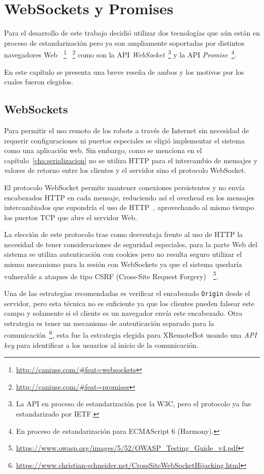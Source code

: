 \chapter{WebSockets y Promises}\label{cha:websockets_y_promises}

Para el desarrollo de este trabajo decidió utilizar dos tecnologías
que aún están en proceso de estandarización pero ya son ampliamente
soportadas por distintos navegadores
Web%
~\footnote{\url{http://caniuse.com/\#feat=websockets}}%
~\footnote{\url{http://caniuse.com/\#feat=promises}}
como son la API
\textit{WebSocket}~\footnote{La API en proceso de estandarización por la W3C,
pero el protocolo ya fue estandarizado por IETF.}
y la API \textit{Promise}~\footnote{En proceso de estandarización para
ECMAScript 6 (Harmony).}.

En este capítulo se presenta una breve reseña de ambos y los motivos
por los cuales fueron elegidos.

\section{WebSockets}

Para permitir el uso remoto de los robots a través de Internet sin necesidad
de requerir configuraciones ni puertos especiales se eligió implementar el
sistema como una
aplicación web. Sin embargo, como se menciona en el
capítulo~\ref{cha:serializacion} no se utiliza HTTP para el intercambio de
mensajes y valores de retorno entre los clientes y el servidor sino el
protocolo WebSocket.

El protocolo WebSocket permite mantener conexiones persistentes y no envía
encabezados HTTP en cada mensaje, reduciendo así el overhead en los mensajes
intercambiados que supondría el uso de HTTP~\citep{wang_2013}, aprovechando al
mismo tiempo los puertos TCP que abre el servidor Web.

La elección de este protocolo trae como desventaja frente al uso de HTTP la
necesidad de tener consideraciones de seguridad especiales, para la parte
Web del sistema se utiliza autenticación con cookies pero no resulta seguro
utilizar el mismo mecanismo para la sesión con WebSockets ya que el sistema
quedaría vulnerable a ataques de tipo CSRF (Cross-Site Request
Forgery)~\citep{owasp_2014}~\footnote{
\url{https://www.owasp.org/images/5/52/OWASP_Testing_Guide_v4.pdf}}.

Una de las estrategias recomendadas es verificar el encabezado \texttt{Origin}
desde el servidor, pero esta técnica no es suficiente ya que los
clientes pueden falsear este campo y solamente si el cliente es un navegador
envía este encabezado.
Otra estrategia es tener un mecanismo de autenticación
separado para la comunicación~\footnote{\url{https://www.christian-schneider.net/CrossSiteWebSocketHijacking.html}},
esta fue la estrategia elegida para XRemoteBot usando una \textit{API key}
para identificar a los usuarios al inicio de la comunicación.

